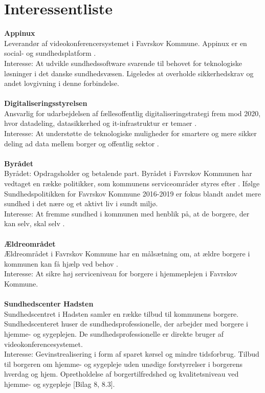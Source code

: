 \documentclass[10pt,a4paper]{article}
\begin{document}
	\section{Interessentliste}
	\textbf{Appinux}\\
	Leverandør af videokonferencersystemet i Favrskov Kommune. Appinux er en social- og sundhedsplatform \cite{appinuxwebsite}.\\
	Interesse: At udvikle sundhedssoftware svarende til behovet for teknologiske løsninger i det danske sundhedsvæsen. Ligeledes at overholde sikkerhedskrav og andet lovgivning i denne forbindelse. \\ \\
	\textbf{Digitaliseringsstyrelsen}\\
	Ansvarlig for udarbejdelsen af fællesoffentlig digitaliseringstrategi frem mod 2020, hvor datadeling, datasikkerhed og it-infrastruktur er temaer \cite{digst1}.\\
	Interesse: At understøtte de teknologiske muligheder for smartere og mere sikker deling ad data mellem borger og offentlig sektor \cite{digst2}.\\ \\
	\textbf{Byrådet}\\
	Byrådet: Opdragsholder og betalende part. Byrådet i Favrskov Kommunen har vedtaget en række politikker, som kommunens serviceområder styres efter \cite{favrskovkommune}. Ifølge Sundhedspolitikken for Favrskov Kommune 2016-2019 er fokus blandt andet mere sundhed i det nære og et aktivt liv i sundt miljø.\\
	Interesse: At fremme sundhed i kommunen med henblik på, at de borgere, der kan selv, skal selv \cite{favrskovkommune2}.\\ \\
	\textbf{Ældreområdet}\\
	Ældreområdet i Favrskov Kommune har en målsætning om, at ældre borgere i kommunen kan få hjælp ved behov \cite{favrskovkommune3}.\\
	Interesse: At sikre høj serviceniveau for borgere i hjemmeplejen i Favrskov Kommune. \\ \\
	\textbf{Sundhedscenter Hadsten}\\
	Sundhedscentret i Hadsten samler en række tilbud til kommunens borgere. Sundhedscenteret huser de sundhedsprofessionelle, der arbejder med borgere i hjemme- og sygeplejen. De sundhedsprofessionelle er direkte bruger af videokonferencesystemet.\\
	Interesse: Gevinstrealisering i form af sparet kørsel og mindre tidsforbrug. Tilbud til borgeren om hjemme- og sygepleje uden unødige forstyrrelser i borgerens hverdag og hjem. Opretholdelse af borgertilfredshed og kvalitetsniveau ved hjemme- og sygepleje [Bilag 8, 8.3].\\ \\
\end{document}
